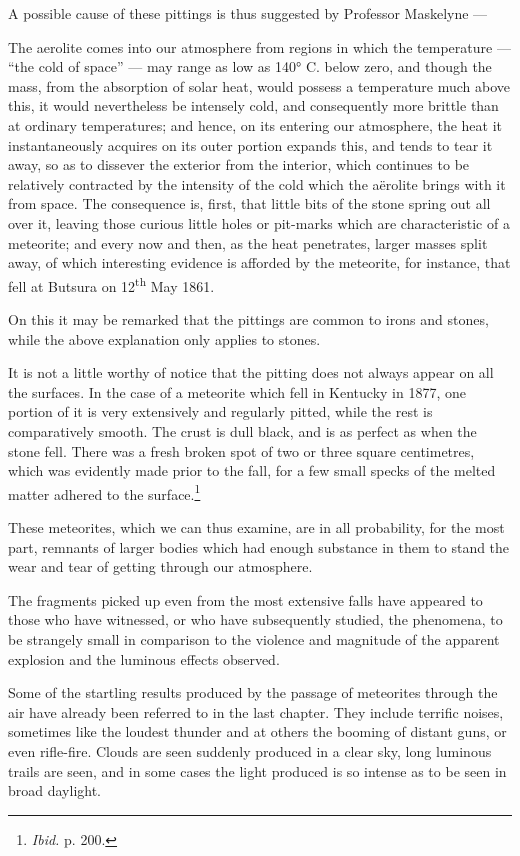 \documentclass[a4paper, 12pt, oneside, polutonikogreek, english]{article}
\begin{document}
A possible cause of these pittings is thus suggested by Professor Maskelyne ---

The aerolite comes into our atmosphere from regions in which the temperature --- ``the cold of space'' --- may range as low as 140° C. below zero, and though the mass, from the absorption of solar heat, would possess a temperature much above this, it would nevertheless be intensely cold, and consequently more brittle than at ordinary temperatures; and hence, on its entering our atmosphere, the heat it instantaneously acquires on its outer portion expands this, and tends to tear it away, so as to dissever the exterior from the interior, which continues to be relatively contracted by the intensity of the cold which the aërolite brings with it from space. The consequence is, first, that little bits of the stone spring out all over it, leaving those curious little holes or pit-marks which are characteristic of a meteorite; and every now and then, as the heat penetrates, larger masses split away, of which interesting evidence is afforded by the meteorite, for instance, that fell at Butsura on 12\textsuperscript{th} May 1861.

On this it may be remarked that the pittings are common to irons and stones, while the above explanation only applies to stones.

It is not a little worthy of notice that the pitting does not always appear on all the surfaces. In the case of a meteorite which fell in Kentucky in 1877, one portion of it is very extensively and regularly pitted, while the rest is comparatively smooth. The crust is dull black, and is as perfect as when the stone fell. There was a fresh broken spot of two or three square centimetres, which was evidently made prior to the fall, for a few small specks of the melted matter adhered to the surface.\footnote{\emph{Ibid.} p. 200.}

These meteorites, which we can thus examine, are in all probability, for the most part, remnants of larger bodies which had enough substance in them to stand the wear and tear of getting through our atmosphere.

The fragments picked up even from the most extensive falls have appeared to those who have witnessed, or who have subsequently studied, the phenomena, to be strangely small in comparison to the violence and magnitude of the apparent explosion and the luminous effects observed.

Some of the startling results produced by the passage of meteorites through the air have already been referred to in the last chapter. They include terrific noises, sometimes like the loudest thunder and at others the booming of distant guns, or even rifle-fire. Clouds are seen suddenly produced in a clear sky, long luminous trails are seen, and in some cases the light produced is so intense as to be seen in broad daylight.
\end{document}
